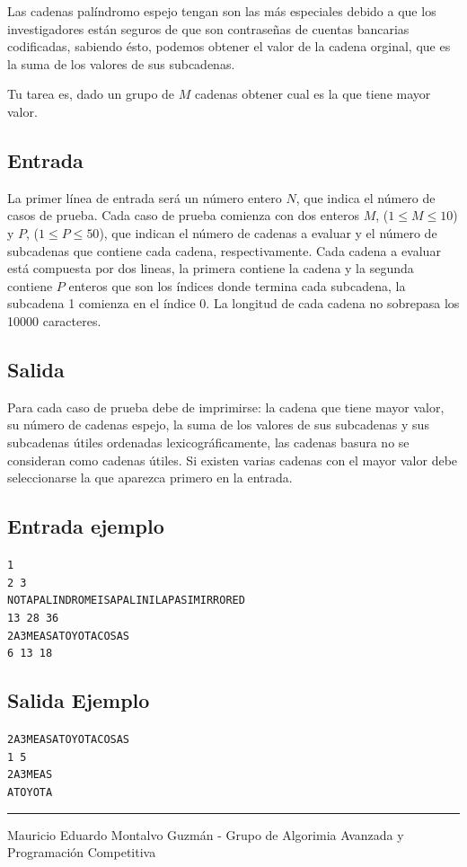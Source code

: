 \documentclass[letter,10pt]{article}
\newcommand{\lyxaddress}[1]{
\par {\raggedright #1
\vspace{1.4em}
\noindent\par}
}
\begin{document}
Las cadenas palíndromo espejo tengan son las más especiales debido a que los investigadores están seguros de que son contraseñas de cuentas bancarias codificadas, sabiendo ésto, podemos obtener el valor de la cadena orginal, que es la suma de los valores de sus subcadenas.

Tu tarea es, dado un grupo de $M$ cadenas obtener cual es la que tiene mayor valor.

\subsection*{Entrada}

La primer línea de entrada será un número entero $N$, que indica el número de casos de prueba. Cada caso de prueba comienza con dos enteros $M$, ($1 \leq M \leq 10$) y $P$, ($1 \leq P \leq 50$), que indican el número de cadenas a evaluar y el número de subcadenas que contiene cada cadena, respectivamente. Cada cadena a evaluar está compuesta por dos lineas, la primera contiene la cadena y la segunda contiene $P$ enteros que son los índices donde termina cada subcadena, la subcadena 1 comienza en el índice 0. La longitud de cada cadena no sobrepasa los 10000 caracteres.

\subsection*{Salida}

Para cada caso de prueba debe de imprimirse: la cadena que tiene mayor valor, su número de cadenas espejo, la suma de los valores de sus subcadenas y sus subcadenas útiles ordenadas lexicográficamente, las cadenas basura no se consideran como cadenas útiles. Si existen varias cadenas con el mayor valor debe seleccionarse la que aparezca primero en la entrada.

\subsection*{Entrada ejemplo}
\noindent \texttt{1}~\\
\texttt{2 3}~\\
\texttt{NOTAPALINDROMEISAPALINILAPASIMIRRORED}~\\
\texttt{13 28 36}~\\
\texttt{2A3MEASATOYOTACOSAS}~\\
\texttt{6 13 18}~\\
\noindent 

\subsection*{Salida Ejemplo}

\noindent \texttt{2A3MEASATOYOTACOSAS}~\\
\texttt{1 5}~\\
\texttt{2A3MEAS}~\\
\texttt{ATOYOTA}~\\

\noindent \rule[0.5ex]{1\columnwidth}{1pt}


\lyxaddress{Mauricio Eduardo Montalvo Guzmán - Grupo de Algorimia Avanzada y Programación Competitiva}
\end{document}
